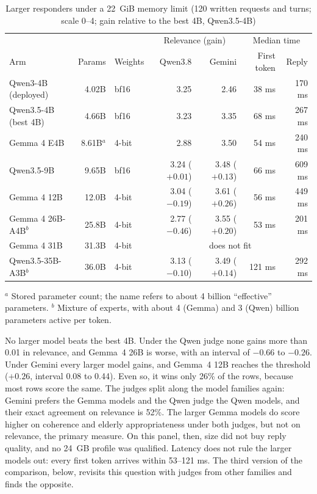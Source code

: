 \begin{table}[ht]
\centering
\caption{Larger responders under a 22~GiB memory limit (120 written requests and turns;
         scale 0--4; gain relative to the best 4B, Qwen3.5-4B)}
\label{tab:resp-size}
\small
\setlength{\tabcolsep}{4pt}
\begin{tabular}{lrlrrrr}
\toprule
 & & & \multicolumn{2}{c}{Relevance (gain)} & \multicolumn{2}{c}{Median time} \\
Arm & Params & Weights & Qwen3.8 & Gemini & First token & Reply \\
\midrule
Qwen3-4B (deployed) & 4.02B & bf16 & 3.25 & 2.46 & 38 ms & 170 ms \\
Qwen3.5-4B (best 4B) & 4.66B & bf16 & 3.23 & 3.35 & 68 ms & 267 ms \\
Gemma 4 E4B & 8.61B$^{a}$ & 4-bit & 2.88 & 3.50 & 54 ms & 240 ms \\
Qwen3.5-9B & 9.65B & bf16 & 3.24 ($+0.01$) & 3.48 ($+0.13$) & 66 ms & 609 ms \\
Gemma 4 12B & 12.0B & 4-bit & 3.04 ($-0.19$) & 3.61 ($+0.26$) & 56 ms & 449 ms \\
Gemma 4 26B-A4B$^{b}$ & 25.8B & 4-bit & 2.77 ($-0.46$) & 3.55 ($+0.20$) & 53 ms & 201 ms \\
Gemma 4 31B & 31.3B & 4-bit & \multicolumn{4}{c}{does not fit} \\
Qwen3.5-35B-A3B$^{b}$ & 36.0B & 4-bit & 3.13 ($-0.10$) & 3.49 ($+0.14$) & 121 ms & 292 ms \\
\bottomrule
\end{tabular}
\par\smallskip\footnotesize
$^{a}$ Stored parameter count; the name refers to about 4 billion ``effective'' parameters.
$^{b}$ Mixture of experts, with about 4 (Gemma) and 3 (Qwen) billion parameters active per
token.
\end{table}

No larger model beats the best 4B. Under the Qwen judge none gains more than 0.01 in
relevance, and Gemma~4 26B is worse, with an interval of $-0.66$ to $-0.26$. Under Gemini
every larger model gains, and Gemma~4 12B reaches the threshold ($+0.26$, interval 0.08 to
0.44). Even so, it wins only 26\% of the rows, because most rows score the same. The
judges split along the model families again: Gemini prefers the Gemma models and the Qwen
judge the Qwen models, and their exact agreement on relevance is 52\%. The larger Gemma
models do score higher on coherence and elderly appropriateness under both judges, but
not on relevance, the primary measure. On this panel, then, size did not buy reply
quality, and no 24~GB profile was qualified. Latency does not rule the larger models out:
every first token arrives within 53--121 ms. The third version of the comparison, below,
revisits this question with judges from other families and finds the opposite.

